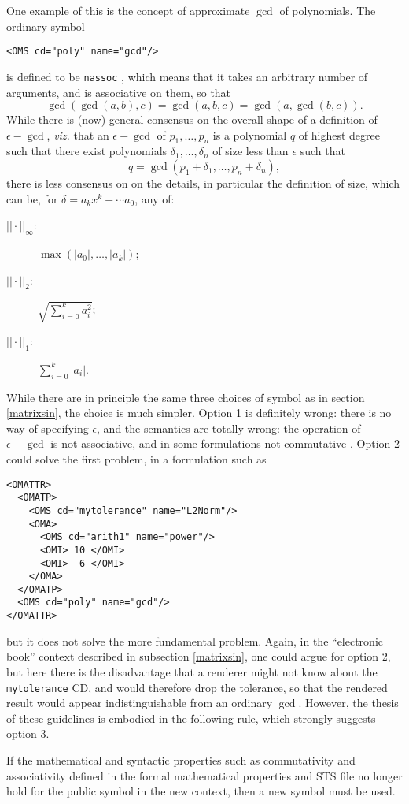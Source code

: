 \documentclass[report,keylogo]{openmath}
\begin{document}
One example of this is the concept of approximate $\gcd$ of polynomials. The
ordinary symbol
\begin{verbatim}
<OMS cd="poly" name="gcd"/>
\end{verbatim}
is defined to be {\tt nassoc} \cite{STS}, which means that it takes an
arbitrary number of arguments, and is associative on them, so that
\begin{equation}\label{gcdassoc}
\gcd(\gcd(a,b),c)=\gcd(a,b,c)=\gcd(a,\gcd(b,c)).
\end{equation}
While there is (now) general consensus on the overall shape of a definition
of $\epsilon-\gcd$, {\it viz.\/} that an $\epsilon-\gcd$ of $p_1,\ldots,p_n$
is a polynomial $q$ of highest degree such that there exist polynomials
$\delta_1,\ldots,\delta_n$ of size less than $\epsilon$ such that
$$
q=\gcd(p_1+\delta_1,\ldots,p_n+\delta_n),
$$
there is less consensus on on the details, in particular the definition of
size, which can be, for $\delta=a_kx^k+\cdots a_0$, any of:
\begin{description}
\item[$||\cdot||_\infty$:]$\max(|a_0|,\ldots,|a_k|)$;
\item[$||\cdot||_2$:]$\sqrt{\sum_{i=0}^k a_i^2}$;
\item[$||\cdot||_1$:]$\sum_{i=0}^k|a_i|$.
\end{description}
While there are in principle the same three choices of symbol as in section
\ref{matrixsin}, the choice is much simpler. Option 1 is definitely wrong:
there is no way of specifying $\epsilon$, and the semantics are totally
wrong: the operation of $\epsilon-\gcd$ is not associative, and in some
formulations not commutative \cite{Rupprecht}. Option 2 could solve the
first problem, in a formulation such as 
\begin{verbatim}
<OMATTR>
  <OMATP>
    <OMS cd="mytolerance" name="L2Norm"/>
    <OMA>
      <OMS cd="arith1" name="power"/>
      <OMI> 10 </OMI>
      <OMI> -6 </OMI>
    </OMA>
  </OMATP>
  <OMS cd="poly" name="gcd"/>
</OMATTR>
\end{verbatim}
but it does not solve the more fundamental problem. Again, in the
``electronic book'' context described in subsection \ref{matrixsin},  one
could argue for option 2, but here there is the disadvantage that a
renderer might not know about the {\tt mytolerance} CD, and would therefore
drop the tolerance, so that the rendered result would appear
indistinguishable from an ordinary $\gcd$. However, the thesis of these
guidelines is embodied in the following rule, which strongly suggests
option 3.
\begin{rule}
If the mathematical and syntactic properties such as commutativity and
associativity defined in the formal mathematical properties and STS file no
longer hold for the public symbol in the new context, then a new symbol
must be used.
\end{rule}
\end{document}
